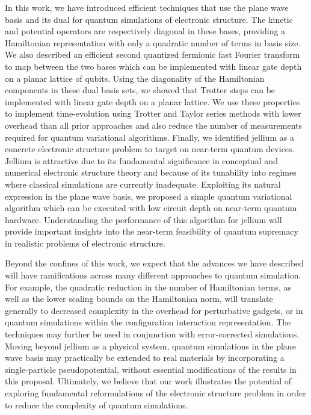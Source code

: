 \documentclass[superscriptaddress,aps,pra,nofootinbib,notitlepage,10pt,longbibliography]{revtex4-1}
\begin{document}
In this work, we have introduced  efficient techniques that use the plane wave basis and its dual for quantum simulations of electronic structure. The kinetic and potential operators are respectively diagonal in these bases,
providing a Hamiltonian representation with only a quadratic number of terms in basis size. We also described an efficient second quantized fermionic fast Fourier transform to map between the two bases which can be implemented with linear gate depth on a planar lattice of qubits. Using the diagonality of the Hamiltonian components in these dual basis sets, we showed that Trotter steps can be implemented with linear gate depth on a planar lattice. We use these properties to implement time-evolution using Trotter and Taylor series methods with lower overhead than all prior approaches and also reduce the number of measurements required for quantum variational algorithms. Finally, we identified jellium as a concrete electronic structure problem to target on near-term quantum devices.
Jellium is attractive due to its fundamental significance in conceptual and numerical electronic structure theory
and because of its tunability into regimes where classical simulations are currently inadequate.
Exploiting its natural expression in the plane wave basis, 
we proposed a simple quantum variational algorithm which can be executed with low circuit depth on near-term quantum hardware.
Understanding the performance of this algorithm for jellium will provide important
insights into the near-term feasibility of quantum supremacy in realistic problems of electronic structure.

Beyond the confines of this work, we expect that the advances we have described will have
ramifications across many different approaches to quantum simulation. For example, the quadratic reduction in the number of Hamiltonian terms, as well as the lower scaling bounds
on the Hamiltonian norm, will translate generally to decreased complexity in the overhead for perturbative gadgets, or in quantum simulations within the configuration interaction representation. The techniques  may further be used in conjunction with error-corrected simulations. Moving beyond jellium as a physical system,  quantum simulations in the plane wave basis may practically be extended to real materials by incorporating a single-particle pseudopotential, without essential modifications of  the results in this proposal. Ultimately, we believe that our work illustrates the potential of exploring fundamental reformulations of the electronic structure problem in order to reduce the complexity of quantum simulations.
\end{document}
